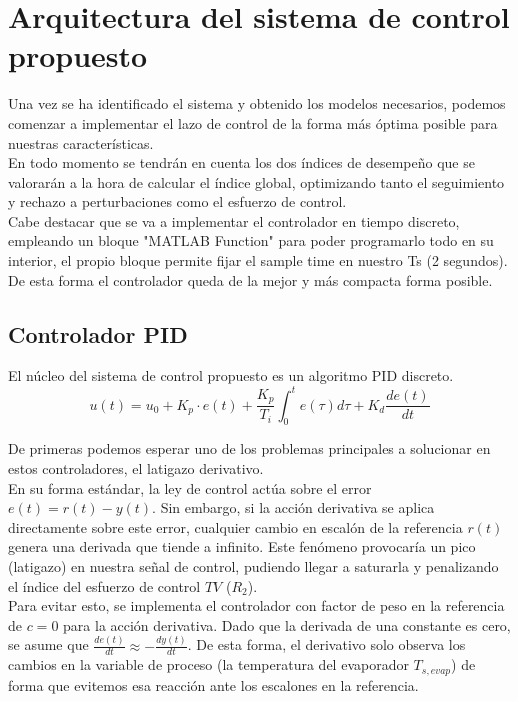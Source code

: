 
\section{Arquitectura del sistema de control propuesto}
\label{arch-ctrl}
	
	Una vez se ha identificado el sistema y obtenido los modelos necesarios, podemos comenzar a implementar el lazo de control de la forma más óptima posible para nuestras características.\\
	En todo momento se tendrán en cuenta los dos índices de desempeño que se valorarán a la hora de calcular el índice global, optimizando tanto el seguimiento y rechazo a perturbaciones como el esfuerzo de control. \\
	
	Cabe destacar que se va a implementar el controlador en tiempo discreto, empleando un bloque "MATLAB Function" para poder programarlo todo en su interior, el propio bloque permite fijar el sample time en nuestro Ts (2 segundos). De esta forma el controlador queda de la mejor y más compacta forma posible. \\
	
	 
	\subsection{Controlador PID}
	
	El núcleo del sistema de control propuesto es un algoritmo PID discreto.
	$$u(t) = u_0 + K_p \cdot e(t) + \frac{K_p}{T_i} \int_{0}^{t} e(\tau) d\tau + K_d \frac{de(t)}{dt}$$  
	
	De primeras podemos esperar uno de los problemas principales a solucionar en estos controladores, el latigazo derivativo.\\ 
	En su forma estándar, la ley de control actúa sobre el error $e(t) = r(t) - y(t)$. Sin embargo, si la acción derivativa se aplica directamente sobre este error, cualquier cambio en escalón de la referencia $r(t)$ genera una derivada que tiende a infinito. Este fenómeno provocaría un pico (latigazo) en nuestra señal de control, pudiendo llegar a saturarla y penalizando el índice del esfuerzo de control $TV$ ($R_2$). \\
	
	Para evitar esto, se implementa el controlador con factor de peso en la referencia de $c=0$ para la acción derivativa. Dado que la derivada de una constante es cero, se asume que $\frac{de(t)}{dt} \approx -\frac{dy(t)}{dt}$. De esta forma, el derivativo solo observa los cambios en la variable de proceso (la temperatura del evaporador $T_{s,evap}$) de forma que evitemos esa reacción ante los escalones en la referencia.\\
	
